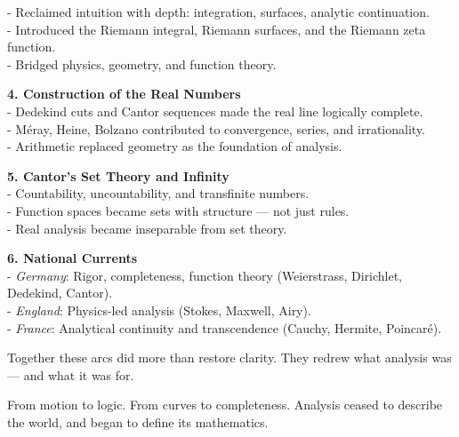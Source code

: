 \documentclass[9pt]{article}
\begin{document}
- Reclaimed intuition with depth: integration, surfaces, analytic continuation.  \\

- Introduced the Riemann integral, Riemann surfaces, and the Riemann zeta function.  \\

- Bridged physics, geometry, and function theory.

\bigskip

\textbf{4. Construction of the Real Numbers}  \\

- Dedekind cuts and Cantor sequences made the real line logically complete. \\

- Méray, Heine, Bolzano contributed to convergence, series, and irrationality.  \\

- Arithmetic replaced geometry as the foundation of analysis.

\bigskip

\textbf{5. Cantor’s Set Theory and Infinity}  \\

- Countability, uncountability, and transfinite numbers.\\

- Function spaces became sets with structure — not just rules.  \\

- Real analysis became inseparable from set theory.

\bigskip

\textbf{6. National Currents} \\

- \textit{Germany}: Rigor, completeness, function theory (Weierstrass, Dirichlet, Dedekind, Cantor).  \\

- \textit{England}: Physics-led analysis (Stokes, Maxwell, Airy).  \\

- \textit{France}: Analytical continuity and transcendence (Cauchy, Hermite, Poincaré).

\bigskip

\noindent
Together these arcs did more than restore clarity.  
They redrew what analysis was — and what it was for.

\vspace{1em}

\noindent
From motion to logic. From curves to completeness.  
Analysis ceased to describe the world, and began to define its mathematics.
\end{document}
